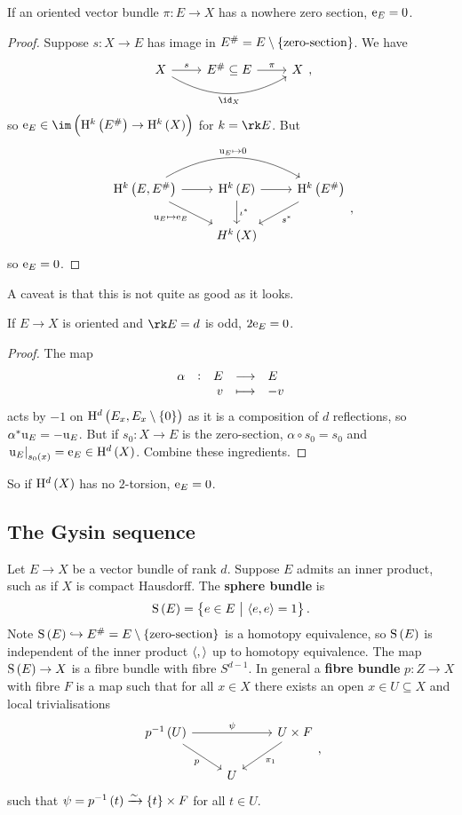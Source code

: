 \begin{lemma}
If an oriented vector bundle $ \pi : E \to X $ has a nowhere zero section, $ \mathrm{e}_E = 0 $.
\end{lemma}

\begin{proof}
Suppose $ s : X \to E $ has image in $ E^\# = E \setminus \cbr{\text{zero-section}} $. We have
$$
\begin{tikzcd}
X \arrow{r}{s} \arrow[bend right=30]{rr}[swap]{\id_X} & E^\# \subseteq E \arrow{r}{\pi} & X
\end{tikzcd},
$$
so $ \e_E \in \im \br{\H^k\br{E^\#} \to \H^k\br{X}} $ for $ k = \rk E $. But
$$
\begin{tikzcd}
\H^k\br{E, E^\#} \arrow{r} \arrow[bend left=30]{rr}{\u_E \mapsto 0} \arrow{dr}[swap]{\u_E \mapsto \e_E} & \H^k\br{E} \arrow{r} \arrow{d}{\iota^*} & \H^k\br{E^\#} \arrow{dl}{s^*} \\
& H^k\br{X} &
\end{tikzcd},
$$
so $ \mathrm{e}_E = 0 $.
\end{proof}

A caveat is that this is not quite as good as it looks.

\begin{lemma}
If $ E \to X $ is oriented and $ \rk E = d $ is odd, $ 2\mathrm{e}_E = 0 $.
\end{lemma}

\begin{proof}
The map
$$ \function[\alpha]{E}{E}{v}{-v} $$
acts by $ -1 $ on $ \H^d\br{E_x, E_x \setminus \cbr{0}} $ as it is a composition of $ d $ reflections, so $ \alpha^*\mathrm{u}_E = -\mathrm{u}_E $. But if $ s_0 : X \to E $ is the zero-section, $ \alpha \circ s_0 = s_0 $ and $ \eval{\u_E}_{s_0\br{x}} = \e_E \in \H^d\br{X} $. Combine these ingredients.
\end{proof}

So if $ \H^d\br{X} $ has no $ 2 $-torsion, $ \mathrm{e}_E = 0 $.

\subsection{The Gysin sequence}

Let $ E \to X $ be a vector bundle of rank $ d $. Suppose $ E $ admits an inner product, such as if $ X $ is compact Hausdorff. The \textbf{sphere bundle} is
$$ \S\br{E} = \cbr{e \in E \st \abr{e, e} = 1}. $$
Note $ \S\br{E} \hookrightarrow E^\# = E \setminus \cbr{\text{zero-section}} $ is a homotopy equivalence, so $ \S\br{E} $ is independent of the inner product $ \left\langle , \right\rangle $ up to homotopy equivalence. The map $ \S\br{E} \to X $ is a fibre bundle with fibre $ S^{d - 1} $. In general a \textbf{fibre bundle} $ p : Z \to X $ with fibre $ F $ is a map such that for all $ x \in X $ there exists an open $ x \in U \subseteq X $ and local trivialisations
$$
\begin{tikzcd}
p^{-1}\br{U} \arrow{rr}{\psi} \arrow{dr}[swap]{p} & & U \times F \arrow{dl}{\pi_1} \\
& U &
\end{tikzcd},
$$
such that $ \psi = p^{-1}\br{t} \xrightarrow{\sim} \cbr{t} \times F $ for all $ t \in U $.

